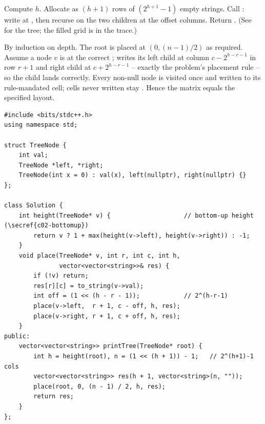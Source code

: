 Compute $h$. Allocate  as $(h+1)$ rows of $(2^{h+1}-1)$ empty strings.
Call : write  at
, then recurse on the two children at the offset columns. Return
. (See  for the tree; the filled grid is in the trace.)

\begin{proofbox}
By induction on depth. The root is placed at $(0,(n-1)/2)$ as required. Assume a
node $v$ is at the correct ;  writes its left child at
column $c-2^{h-r-1}$ in row $r+1$ and right child at $c+2^{h-r-1}$ -- exactly the
problem's placement rule -- so the child lands correctly. Every non-null node is
visited once and written to its rule-mandated cell; cells never written stay
. Hence the matrix equals the specified layout.
\end{proofbox}

\begin{lstlisting}[caption={Print Binary Tree (LeetCode 655) -- carry (row, col) down}, label={lst:c02-print}]
#include <bits/stdc++.h>
using namespace std;

struct TreeNode {
    int val;
    TreeNode *left, *right;
    TreeNode(int x = 0) : val(x), left(nullptr), right(nullptr) {}
};

class Solution {
    int height(TreeNode* v) {                    // bottom-up height (\secref{c02-bottomup})
        return v ? 1 + max(height(v->left), height(v->right)) : -1;
    }
    void place(TreeNode* v, int r, int c, int h,
               vector<vector<string>>& res) {
        if (!v) return;
        res[r][c] = to_string(v->val);
        int off = (1 << (h - r - 1));            // 2^(h-r-1)
        place(v->left,  r + 1, c - off, h, res);
        place(v->right, r + 1, c + off, h, res);
    }
public:
    vector<vector<string>> printTree(TreeNode* root) {
        int h = height(root), n = (1 << (h + 1)) - 1;   // 2^(h+1)-1 cols
        vector<vector<string>> res(h + 1, vector<string>(n, ""));
        place(root, 0, (n - 1) / 2, h, res);
        return res;
    }
};
\end{lstlisting}


